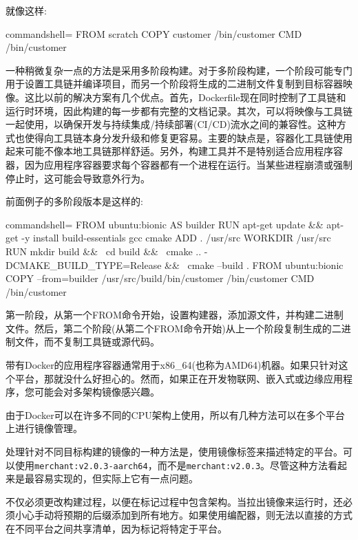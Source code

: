 就像这样:

\begin{tcblisting}{commandshell={}}
FROM scratch
COPY customer /bin/customer
CMD /bin/customer
\end{tcblisting}

一种稍微复杂一点的方法是采用多阶段构建。对于多阶段构建，一个阶段可能专门用于设置工具链并编译项目，而另一个阶段将生成的二进制文件复制到目标容器映像。这比以前的解决方案有几个优点。首先，Dockerfile现在同时控制了工具链和运行时环境，因此构建的每一步都有完整的文档记录。其次，可以将映像与工具链一起使用，以确保开发与持续集成/持续部署(CI/CD)流水之间的兼容性。这种方式也使得向工具链本身分发升级和修复更容易。主要的缺点是，容器化工具链使用起来可能不像本地工具链那样舒适。另外，构建工具并不是特别适合应用程序容器，因为应用程序容器要求每个容器都有一个进程在运行。当某些进程崩溃或强制停止时，这可能会导致意外行为。

前面例子的多阶段版本是这样的:

\begin{tcblisting}{commandshell={}}
FROM ubuntu:bionic AS builder
RUN apt-get update && apt-get -y install build-essentials gcc cmake
ADD . /usr/src
WORKDIR /usr/src
RUN mkdir build && \
    cd build && \
    cmake .. -DCMAKE_BUILD_TYPE=Release && \
    cmake --build .
FROM ubuntu:bionic
COPY --from=builder /usr/src/build/bin/customer /bin/customer
CMD /bin/customer
\end{tcblisting}

第一阶段，从第一个FROM命令开始，设置构建器，添加源文件，并构建二进制文件。然后，第二个阶段(从第二个FROM命令开始)从上一个阶段复制生成的二进制文件，而不复制工具链或源代码。


带有Docker的应用程序容器通常用于x86\_64(也称为AMD64)机器。如果只针对这个平台，那就没什么好担心的。然而，如果正在开发物联网、嵌入式或边缘应用程序，您可能会对多架构镜像感兴趣。

由于Docker可以在许多不同的CPU架构上使用，所以有几种方法可以在多个平台上进行镜像管理。

处理针对不同目标构建的镜像的一种方法是，使用镜像标签来描述特定的平台。可以使用\texttt{merchant:v2.0.3-aarch64}，而不是\texttt{merchant:v2.0.3}。尽管这种方法看起来是最容易实现的，但实际上它有一点问题。

不仅必须更改构建过程，以便在标记过程中包含架构。当拉出镜像来运行时，还必须小心手动将预期的后缀添加到所有地方。如果使用编配器，则无法以直接的方式在不同平台之间共享清单，因为标记将特定于平台。

